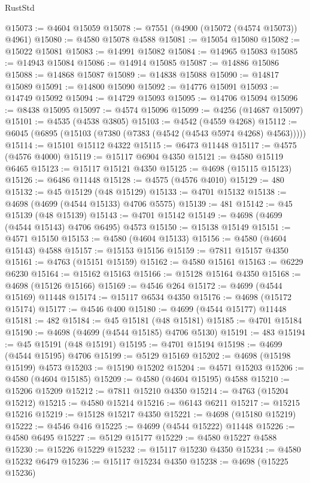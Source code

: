 \begin{lexlean}{RustStd}
\begin{coremodule}
@15073 := @4604 @15059
@15078 := @7551 (@4900 (@15072 (@4574 @15073)) @4961)
@15080 := @4580 @15078 @4588
@15081 := @15054 @15080
@15082 := @15022 @15081
@15083 := @14991 @15082
@15084 := @14965 @15083
@15085 := @14943 @15084
@15086 := @14914 @15085
@15087 := @14886 @15086
@15088 := @14868 @15087
@15089 := @14838 @15088
@15090 := @14817 @15089
@15091 := @14800 @15090
@15092 := @14776 @15091
@15093 := @14749 @15092
@15094 := @14729 @15093
@15095 := @14706 @15094
@15096 := @8438 @15095
@15097 := @4574 @15096
@15099 := @4256 (@14687 @15097)
@15101 := @4535 (@4538 @3805)
@15103 := @4542 (@4559 @4268)
@15112 := @6045 (@6895 (@15103 (@7380 (@7383 (@4542 (@4543 @5974 @4268) @4563)))))
@15114 := @15101 @15112 @4322
@15115 := @6473 @11448
@15117 := @4575 (@4576 @4000)
@15119 := @15117 @6904 @4350
@15121 := @4580 @15119 @6465
@15123 := @15117 @15121 @4350
@15125 := @4698 (@15115 @15123)
@15126 := @6486 @11448
@15128 := @4575 (@4576 @4010)
@15129 := 480
@15132 := @45 @15129 (@48 @15129)
@15133 := @4701 @15132
@15138 := @4698 (@4699 (@4544 @15133) @4706 @5575)
@15139 := 481
@15142 := @45 @15139 (@48 @15139)
@15143 := @4701 @15142
@15149 := @4698 (@4699 (@4544 @15143) @4706 @6495) @4573
@15150 := @15138 @15149
@15151 := @4571 @15150
@15153 := @4580 (@4604 @15133)
@15156 := @4580 (@4604 @15143) @4588
@15157 := @15153 @15156
@15159 := @7811 @15157 @4350
@15161 := @4763 (@15151 @15159)
@15162 := @4580 @15161
@15163 := @6229 @6230
@15164 := @15162 @15163
@15166 := @15128 @15164 @4350
@15168 := @4698 (@15126 @15166)
@15169 := @4546 @264
@15172 := @4699 (@4544 @15169) @11448
@15174 := @15117 @6534 @4350
@15176 := @4698 (@15172 @15174)
@15177 := @4546 @400
@15180 := @4699 (@4544 @15177) @11448
@15181 := 482
@15184 := @45 @15181 (@48 @15181)
@15185 := @4701 @15184
@15190 := @4698 (@4699 (@4544 @15185) @4706 @5130)
@15191 := 483
@15194 := @45 @15191 (@48 @15191)
@15195 := @4701 @15194
@15198 := @4699 (@4544 @15195) @4706
@15199 := @5129 @15169
@15202 := @4698 (@15198 @15199) @4573
@15203 := @15190 @15202
@15204 := @4571 @15203
@15206 := @4580 (@4604 @15185)
@15209 := @4580 (@4604 @15195) @4588
@15210 := @15206 @15209
@15212 := @7811 @15210 @4350
@15214 := @4763 (@15204 @15212)
@15215 := @4580 @15214
@15216 := @6143 @6211
@15217 := @15215 @15216
@15219 := @15128 @15217 @4350
@15221 := @4698 (@15180 @15219)
@15222 := @4546 @416
@15225 := @4699 (@4544 @15222) @11448
@15226 := @4580 @6495
@15227 := @5129 @15177
@15229 := @4580 @15227 @4588
@15230 := @15226 @15229
@15232 := @15117 @15230 @4350
@15234 := @4580 @15232 @6479
@15236 := @15117 @15234 @4350
@15238 := @4698 (@15225 @15236)

\end{coremodule}
\end{lexlean}

